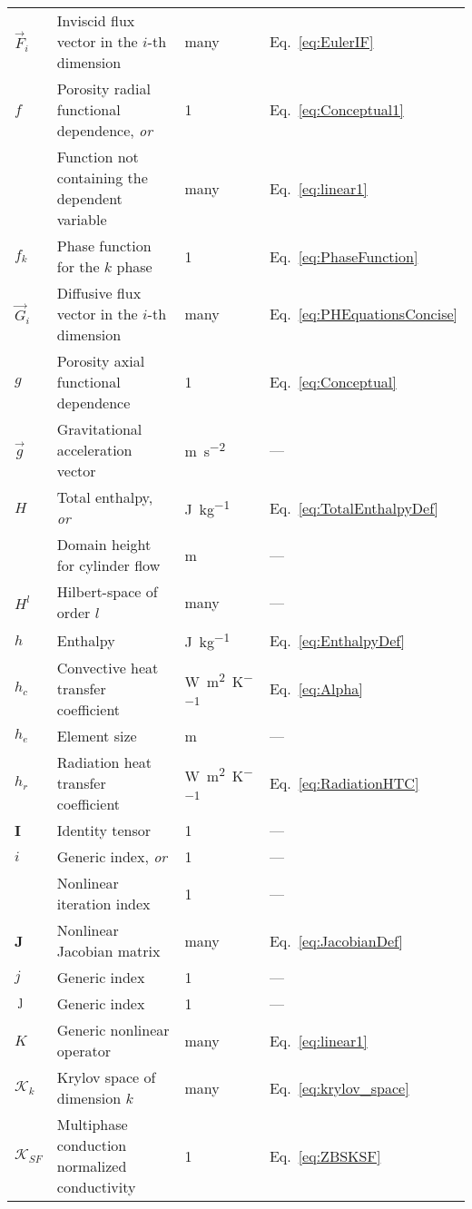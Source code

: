 \begin{longtable}{p{2cm}p{9cm}p{2cm}p{5cm}}
\(\vec{F}_i\) & Inviscid flux vector in the \(i\)-th dimension & many & Eq.\ \eqref{eq:EulerIF}\\
\(f\) & Porosity radial functional dependence, \textit{or} & 1 & Eq.\ \eqref{eq:Conceptual1}\\
& Function not containing the dependent variable & many & Eq.\ \eqref{eq:linear1}\\
\(f_k\) & Phase function for the \(k\) phase & 1 & Eq.\ \eqref{eq:PhaseFunction}\\
\(\vec{G}_i\) & Diffusive flux vector in the \(i\)-th dimension & many & Eq.\ \eqref{eq:PHEquationsConcise}\\
\(g\) & Porosity axial functional dependence & 1 & Eq.\ \eqref{eq:Conceptual}\\
\(\vec{g}\) & Gravitational acceleration vector & \si{\meter\per\square\second} & ---\\
\(H\) & Total enthalpy, \textit{or} & \si{\joule\per\kilo\gram} & Eq.\ \eqref{eq:TotalEnthalpyDef}\\
& Domain height for cylinder flow & \si{\meter} & ---\\
\(H^l\) & Hilbert-space of order \(l\) & many & ---\\
\(h\) & Enthalpy & \si{\joule\per\kilo\gram} & Eq.\ \eqref{eq:EnthalpyDef}\\
\(h_c\) & Convective heat transfer coefficient & \si{\watt\per\square\meter\per\kelvin} & Eq.\ \eqref{eq:Alpha}\\
\(h_e\) & Element size & \si{\meter} & ---\\
\(h_r\) & Radiation heat transfer coefficient & \si{\watt\per\square\meter\per\kelvin} & Eq.\ \eqref{eq:RadiationHTC}\\
\(\textbf{I}\) & Identity tensor & 1 & ---\\
\(i\) & Generic index, \textit{or} & 1 & ---\\
& Nonlinear iteration index & 1 & ---\\
\textbf{J} & Nonlinear Jacobian matrix & many & Eq.\ \eqref{eq:JacobianDef}\\
\(j\) & Generic index & 1 & ---\\
\(\jmath\) & Generic index & 1 & ---\\
\(K\) & Generic nonlinear operator & many & Eq.\ \eqref{eq:linear1}\\
\(\mathcal{K}_k\) & Krylov space of dimension \(k\) & many & Eq.\ \eqref{eq:krylov_space}\\
\(\mathscr{K}_{SF}\) & Multiphase conduction normalized conductivity & 1 & Eq.\ \eqref{eq:ZBSKSF}\\

\end{longtable}
